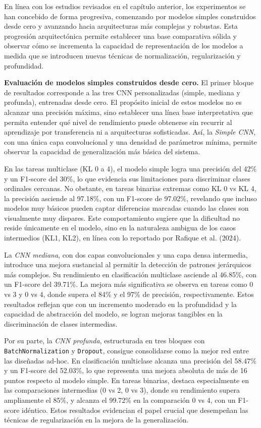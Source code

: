 \documentclass[11pt,spanish,listoffigures,listoftables]{tfgetsinf}
\begin{document}
En línea con los estudios revisados en el capítulo anterior, los experimentos se han concebido de forma progresiva, comenzando por modelos simples construidos desde cero y avanzando hacia arquitecturas más complejas y robustas. Esta progresión arquitectónica permite establecer una base comparativa sólida y observar cómo se incrementa la capacidad de representación de los modelos a medida que se introducen nuevas técnicas de normalización, regularización y profundidad.

\textbf{Evaluación de modelos simples construidos desde cero.}
El primer bloque de resultados corresponde a las tres CNN personalizadas (simple, mediana y profunda), entrenadas desde cero. El propósito inicial de estos modelos no es alcanzar una precisión máxima, sino establecer una línea base interpretativa que permita entender qué nivel de rendimiento puede obtenerse sin recurrir al aprendizaje por transferencia ni a arquitecturas sofisticadas. Así, la \emph{Simple CNN}, con una única capa convolucional y una densidad de parámetros mínima, permite observar la capacidad de generalización más básica del sistema.

En las tareas multiclase (KL 0 a 4), el modelo simple logra una precisión del 42\% y un F1-score del 30\%, lo que evidencia sus limitaciones para discriminar clases ordinales cercanas. No obstante, en tareas binarias extremas como KL 0 vs KL 4, la precisión asciende al 97.18\%, con un F1-score de 97.02\%, revelando que incluso modelos muy básicos pueden captar diferencias marcadas cuando las clases son visualmente muy dispares. Este comportamiento sugiere que la dificultad no reside únicamente en el modelo, sino en la naturaleza ambigua de los casos intermedios (KL1, KL2), en línea con lo reportado por Rafique et al. (2024).

La \emph{CNN mediana}, con dos capas convolucionales y una capa densa intermedia, introduce una mejora sustancial al permitir la detección de patrones jerárquicos más complejos. Su rendimiento en clasificación multiclase asciende al 46.85\%, con un F1-score del 39.71\%. La mejora más significativa se observa en tareas como 0 vs 3 y 0 vs 4, donde supera el 84\% y el 97\% de precisión, respectivamente. Estos resultados reflejan que con un incremento moderado en la profundidad y la capacidad de abstracción del modelo, se logran mejoras tangibles en la discriminación de clases intermedias.

Por su parte, la \emph{CNN profunda}, estructurada en tres bloques con \texttt{BatchNormalization} y \texttt{Dropout}, consigue consolidarse como la mejor red entre las diseñadas ad-hoc. En clasificación multiclase alcanza una precisión del 58.47\% y un F1-score del 52.03\%, lo que representa una mejora absoluta de más de 16 puntos respecto al modelo simple. En tareas binarias, destaca especialmente en las comparaciones intermedias (0 vs 2, 0 vs 3), donde su rendimiento supera ampliamente el 85\%, y alcanza el 99.72\% en la comparación 0 vs 4, con un F1-score idéntico. Estos resultados evidencian el papel crucial que desempeñan las técnicas de regularización en la mejora de la generalización.
\end{document}
